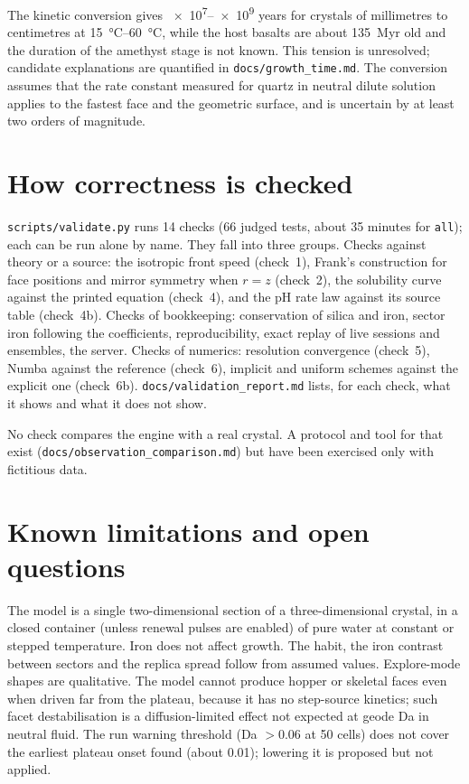 \documentclass[11pt,a4paper]{article}
\newcommand{\code}[1]{\texttt{#1}}
\begin{document}
The kinetic conversion gives \numrange{e7}{e9} years for crystals of millimetres to centimetres at \SIrange{15}{60}{\celsius}, while the host basalts are about \SI{135}{Myr} old \citep{Thiede2010} and the duration of the amethyst stage is not known. This tension is unresolved; candidate explanations are quantified in \code{docs/growth\_time.md}. The conversion assumes that the rate constant measured for quartz in neutral dilute solution applies to the fastest face and the geometric surface, and is uncertain by at least two orders of magnitude.

\section{How correctness is checked}\label{sec:validation}

\code{scripts/validate.py} runs 14 checks (66 judged tests, about 35 minutes for \code{all}); each can be run alone by name. They fall into three groups. Checks against theory or a source: the isotropic front speed (check~1), Frank's construction for face positions and mirror symmetry when $r=z$ (check~2), the solubility curve against the printed equation (check~4), and the pH rate law against its source table (check~4b). Checks of bookkeeping: conservation of silica and iron, sector iron following the coefficients, reproducibility, exact replay of live sessions and ensembles, the server. Checks of numerics: resolution convergence (check~5), Numba against the reference (check~6), implicit and uniform schemes against the explicit one (check~6b). \code{docs/validation\_report.md} lists, for each check, what it shows and what it does not show.

No check compares the engine with a real crystal. A protocol and tool for that exist (\code{docs/observation\_comparison.md}) but have been exercised only with fictitious data.

\section{Known limitations and open questions}\label{sec:limits}

The model is a single two-dimensional section of a three-dimensional crystal, in a closed container (unless renewal pulses are enabled) of pure water at constant or stepped temperature. Iron does not affect growth. The habit, the iron contrast between sectors and the replica spread follow from assumed values. Explore-mode shapes are qualitative. The model cannot produce hopper or skeletal faces even when driven far from the plateau, because it has no step-source kinetics; such facet destabilisation is a diffusion-limited effect not expected at geode Da in neutral fluid. The run warning threshold (Da $>0.06$ at 50 cells) does not cover the earliest plateau onset found (about \num{0.01}); lowering it is proposed but not applied.
\end{document}
